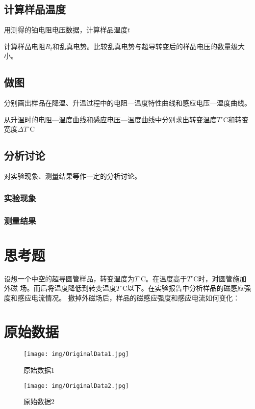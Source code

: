 \documentclass[UTF8]{ctexart}
\begin{document}
    \subsection{计算样品温度}

    用测得的铂电阻电压数据，计算样品温度$t$

    计算样品电阻$R_t$和乱真电势。比较乱真电势与超导转变后的样品电压的数量级大小。

    \subsection{做图}

    分别画出样品在降温、升温过程中的电阻—温度特性曲线和感应电压—温度曲线。

    从升温时的电阻—温度曲线和感应电压—温度曲线中分别求出转变温度$T^{\circ}$C和转变宽度$\Delta T^{\circ}$C

    \subsection{分析讨论}

    对实验现象、测量结果等作一定的分析讨论。

    \subsubsection{实验现象}

    \subsubsection{测量结果}

\section{思考题}

    设想一个中空的超导圆管样品，转变温度为$T^{\circ}$C。在温度高于$T^{\circ}$C时，对圆管施加外磁
    场。而后将温度降低到转变温度$T^{\circ}$C以下。在实验报告中分析样品的磁感应强度和感应电流情况。
    撤掉外磁场后，样品的磁感应强度和感应电流如何变化：

\newpage
\section{原始数据}
    \begin{center}
        \begin{figure}[H] %
            \centering %
            \texttt{[image: img/OriginalData1.jpg]} %
            \caption{原始数据1} %
            \label{原始数据-1} %
        \end{figure}
        \begin{figure}[H] %
            \centering %
            \texttt{[image: img/OriginalData2.jpg]} %
            \caption{原始数据2} %
            \label{原始数据-2} %
        \end{figure}
    \end{center}
\end{document}
